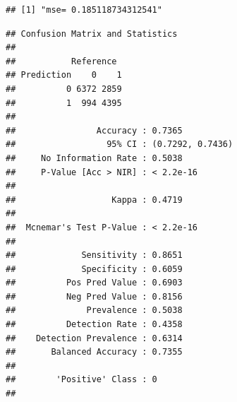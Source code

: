\documentclass[
]{article}
\newenvironment{Shaded}{\begin{snugshade}}{\end{snugshade}}
\newcommand{\AttributeTok}[1]{\textcolor[rgb]{0.77,0.63,0.00}{#1}}
\newcommand{\DecValTok}[1]{\textcolor[rgb]{0.00,0.00,0.81}{#1}}
\newcommand{\FloatTok}[1]{\textcolor[rgb]{0.00,0.00,0.81}{#1}}
\newcommand{\FunctionTok}[1]{\textcolor[rgb]{0.00,0.00,0.00}{#1}}
\newcommand{\NormalTok}[1]{#1}
\newcommand{\OtherTok}[1]{\textcolor[rgb]{0.56,0.35,0.01}{#1}}
\newcommand{\SpecialCharTok}[1]{\textcolor[rgb]{0.00,0.00,0.00}{#1}}
\newcommand{\StringTok}[1]{\textcolor[rgb]{0.31,0.60,0.02}{#1}}
\begin{document}
\begin{verbatim}
## [1] "mse= 0.185118734312541"
\end{verbatim}

\begin{Shaded}
\end{Shaded}

\begin{verbatim}
## Confusion Matrix and Statistics
## 
##           Reference
## Prediction    0    1
##          0 6372 2859
##          1  994 4395
##                                           
##                Accuracy : 0.7365          
##                  95% CI : (0.7292, 0.7436)
##     No Information Rate : 0.5038          
##     P-Value [Acc > NIR] : < 2.2e-16       
##                                           
##                   Kappa : 0.4719          
##                                           
##  Mcnemar's Test P-Value : < 2.2e-16       
##                                           
##             Sensitivity : 0.8651          
##             Specificity : 0.6059          
##          Pos Pred Value : 0.6903          
##          Neg Pred Value : 0.8156          
##              Prevalence : 0.5038          
##          Detection Rate : 0.4358          
##    Detection Prevalence : 0.6314          
##       Balanced Accuracy : 0.7355          
##                                           
##        'Positive' Class : 0               
## 
\end{verbatim}

\begin{Shaded}
\end{Shaded}
\end{document}
